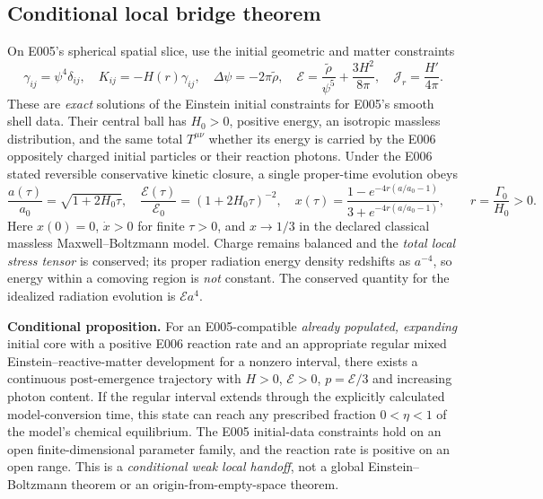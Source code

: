 \documentclass[11pt,a4paper]{article}
\theoremstyle{tmon}
\theoremstyle{definition}
\begin{document}
\subsection{Conditional local bridge theorem}
On E005's spherical spatial slice, use the initial geometric and matter constraints
\begin{equation}
\gamma_{ij}=\psi^4\delta_{ij},\quad K_{ij}=-H(r)\gamma_{ij},\quad
\Delta\psi=-2\pi\widetilde\rho,\quad
\mathcal E=\frac{\widetilde\rho}{\psi^5}+\frac{3H^2}{8\pi},\quad
\mathcal J_r=\frac{H'}{4\pi}.
\end{equation}
These are \emph{exact} solutions of the Einstein initial constraints for E005's smooth shell data. Their central ball has $H_0>0$, positive energy, an isotropic massless distribution, and the same total $T^{\mu\nu}$ whether its energy is carried by the E006 oppositely charged initial particles or their reaction photons. Under the E006 stated reversible conservative kinetic closure, a single proper-time evolution obeys
\begin{equation}\label{eq:e008history}
\boxed{\frac{a(\tau)}{a_0}=\sqrt{1+2H_0\tau},\quad
\frac{\mathcal E(\tau)}{\mathcal E_0}=(1+2H_0\tau)^{-2},\quad
x(\tau)=\frac{1-e^{-4r(a/a_0-1)}}{3+e^{-4r(a/a_0-1)}}},\qquad r=\frac{\Gamma_0}{H_0}>0.
\end{equation}
Here $x(0)=0$, $\dot x>0$ for finite $\tau>0$, and $x\to 1/3$ in the declared classical massless Maxwell--Boltzmann model. Charge remains balanced and the \emph{total local stress tensor} is conserved; its proper radiation energy density redshifts as $a^{-4}$, so energy within a comoving region is \emph{not} constant. The conserved quantity for the idealized radiation evolution is $\mathcal E a^4$.

\textbf{Conditional proposition.} For an E005-compatible \emph{already populated, expanding} initial core with a positive E006 reaction rate and an appropriate regular mixed Einstein--reactive-matter development for a nonzero interval, there exists a continuous post-emergence trajectory with $H>0$, $\mathcal E>0$, $p=\mathcal E/3$ and increasing photon content. If the regular interval extends through the explicitly calculated model-conversion time, this state can reach any prescribed fraction $0<\eta<1$ of the model's chemical equilibrium. The E005 initial-data constraints hold on an open finite-dimensional parameter family, and the reaction rate is positive on an open range. This is a \emph{conditional weak local handoff}, not a global Einstein--Boltzmann theorem or an origin-from-empty-space theorem.
\end{document}
